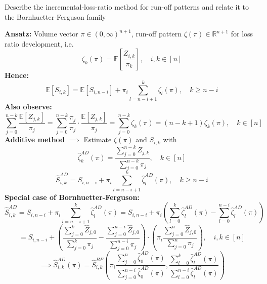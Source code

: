 \documentclass[11pt,a4paper,twoside]{article}
\begin{document}
Describe the incremental-loss-ratio method for run-off patterns and relate it to the Bornhuetter-Ferguson family

\textbf{Ansatz:} Volume vector $\pi \in (0, \infty)^{n+1}$, run-off pattern $\zeta(\pi) \in \mathbb{R}^{n+1}$ for loss ratio development, i.e.
\[
\zeta_k(\pi) = \mathbb{E}\left[\frac{Z_{i,k}}{\pi_k}\right], \quad i, k \in [n]
\]
\textbf{Hence:}
\[
\mathbb{E}[S_{i,k}] = \mathbb{E}[S_{i,n-i}] + \pi_i \sum_{l=n-i+1}^k \zeta_l(\pi), \quad k \ge n-i
\]
\textbf{Also observe:}
\[
\sum_{j=0}^{n-k} \frac{\mathbb{E}[Z_{j,k}]}{\pi_j} = \sum_{j=0}^{n-k} \frac{\pi_j}{\pi_j} \cdot \frac{\mathbb{E}[Z_{j,k}]}{\pi_j} = \sum_{j=0}^{n-k} \zeta_k(\pi) = (n-k+1) \zeta_k(\pi), \quad k \in [n]
\]
\textbf{Additive method}
$\implies$ Estimate $\zeta(\pi)$ and $S_{i,k}$ with
\[
\widehat{\zeta}_k^{AD}(\pi) = \frac{\sum_{j=0}^{n-k} Z_{j,k}}{\sum_{j=0}^{n-k} \pi_j}, \quad k \in [n]
\]
\[
\widehat{S}_{i,k}^{AD} = S_{i,n-i} + \pi_i \sum_{l=n-i+1}^k \widehat{\zeta}_l^{AD}(\pi), \quad k \ge n-i
\]
\textbf{Special case of Bornhuetter-Ferguson:}
\[
\widehat{S}_{i,k}^{AD} = S_{i,n-i} + \pi_i \sum_{l=n-i+1}^k \widehat{\zeta}_l^{AD}(\pi) = S_{i,n-i} + \pi_i \left( \sum_{l=0}^k \widehat{\zeta}_l^{AD}(\pi) - \sum_{l=0}^{n-i} \widehat{\zeta}_l^{AD}(\pi) \right)
\]
\[
= S_{i,n-i} + \left( \frac{\sum_{j=0}^k \widehat{Z}_{j,0}}{\sum_{j=0}^k \pi_j} - \frac{\sum_{j=0}^{n-i} \widehat{Z}_{j,0}}{\sum_{j=0}^{n-i} \pi_j} \right) \cdot \left( \pi_i \frac{\sum_{j=0}^n \widehat{Z}_{j,0}}{\sum_{j=0}^n \pi_j} \right), \quad i, k \in [n]
\]
\[
\implies \widehat{S}_{i,k}^{AD}(\pi) = \widehat{S}_{i,k}^{BF}\left( \pi_i \frac{\sum_{j=0}^n \widehat{\zeta}_0^{AD}(\pi)}{\sum_{j=0}^{n-i} \widehat{\zeta}_0^{AD}(\pi)}, \frac{\sum_{l=0}^k \widehat{\zeta}_l^{AD}(\pi)}{\sum_{l=0}^{n-i} \widehat{\zeta}_l^{AD}(\pi)} \right)
\]
\end{document}
